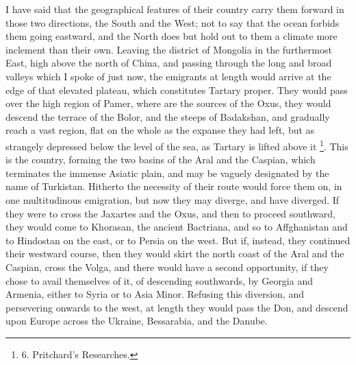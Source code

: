 I have said that the
geographical features of their country carry them forward in those two
directions, the South and the West; not to say that the ocean forbids
them going eastward, and the North does but hold out to them a
climate more inclement than their own. Leaving the district of
Mongolia in the furthermost East, high above the north of China, and
passing through the long and broad valleys which I spoke of just now,
the emigrants at length would arrive at the edge of that elevated
plateau, which constitutes Tartary proper. They would pass over the
high region of Pamer, where are the sources of the Oxus, they would
descend the terrace of the Bolor, and the steeps of Badakshan, and
gradually reach a vast region, flat on the whole as the expanse they
had left, but as strangely depressed below the level of the sea, as
Tartary is lifted above it \footnote{6.
Pritchard's Researches.}.
This is the country, forming the two basins of the Aral and the
Caspian, which terminates the immense Asiatic plain, and may be
vaguely designated by the name of Turkistan. Hitherto the necessity of
their route would force them on, in one multitudinous emigration, but
now they may diverge, and have diverged. If they were to cross the
Jaxartes and the Oxus, and then to proceed southward, they would come
to Khorasan, the ancient Bactriana, and so to Affghanistan and to
Hindostan on the east, or to Persia on the west. But if, instead, they
continued their westward course, then they would skirt the north coast
of the Aral and the Caspian, cross the Volga, and there would have a
second opportunity, if they chose to avail themselves of it, of
descending southwards, by Georgia and Armenia, either to Syria or to
Asia Minor. Refusing this diversion, and persevering onwards to the
west, at length they would pass the Don, and descend upon Europe
across the Ukraine, Bessarabia, and the Danube.


